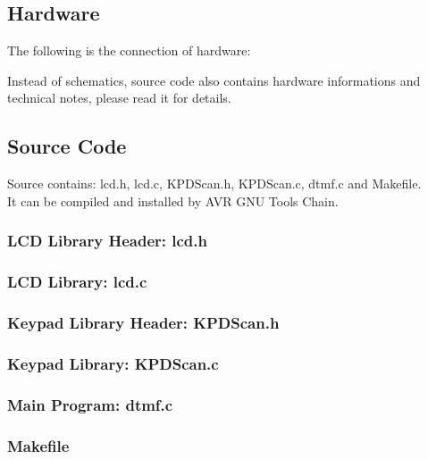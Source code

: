 \documentclass[11pt,a4paper]{article}
\begin{document}
\subsection{Hardware}
The following is the connection of hardware:


Instead of schematics, source code also contains hardware informations
and technical notes, please read it for details.\\


\subsection{Source Code}
Source contains: lcd.h, lcd.c, KPDScan.h, KPDScan.c, dtmf.c and Makefile.\\
It can be compiled and installed by AVR GNU Tools Chain.

\subsubsection{LCD Library Header: lcd.h}


\subsubsection{LCD Library: lcd.c}


\subsubsection{Keypad Library Header: KPDScan.h}


\subsubsection{Keypad Library: KPDScan.c}


\subsubsection{Main Program: dtmf.c}


\subsubsection{Makefile}

\end{document}
